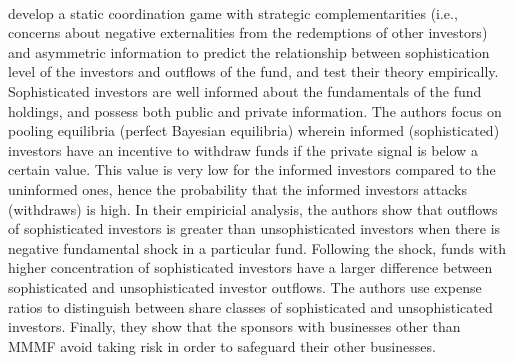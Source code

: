 \documentclass[11pt]{article}
\begin{document}
\paragraph{} \cite{schmidt2016runs} develop a static coordination game with strategic complementarities (i.e., concerns about negative externalities from the redemptions of other investors) and asymmetric information to predict the relationship between sophistication level of the investors and outflows of the fund, and test their theory empirically. Sophisticated investors are well informed about the fundamentals of the fund holdings, and possess both public and private information. The authors focus on pooling equilibria (perfect Bayesian equilibria) wherein informed (sophisticated) investors have an incentive to withdraw funds if the private signal is below a certain value. This value is very low for the informed investors compared to the uninformed ones, hence the probability that the informed investors attacks (withdraws) is high. In their empiricial analysis, the authors show that outflows of sophisticated investors is greater than unsophisticated investors when there is negative fundamental shock in a particular fund. Following the shock, funds with higher concentration of sophisticated investors have a larger difference between sophisticated and unsophisticated investor outflows. The authors use expense ratios to distinguish between share classes of sophisticated and unsophisticated investors. Finally, they show that the sponsors with businesses other than MMMF avoid taking risk in order to safeguard their other businesses. 
\end{document}
